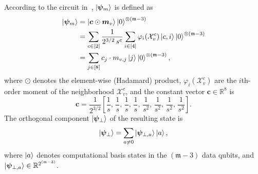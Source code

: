 \documentclass[
  reprint,
  superscriptaddress,
  amsmath,amssymb,
  aps,prl,
]{revtex4-2}
\begin{document}
According to the circuit in~, \(\ket{\boldsymbol{\psi}_m}\) is defined as
\begin{align}
\ket{\boldsymbol{\psi}_m} 
&= \ket{\boldsymbol{c} \odot \boldsymbol{m}_v} \ket{0}^{\otimes (\mathfrak{m} - 3)} \label{eq:psi_m}\\ 
&= \sum_{c \in [2]} \frac{1}{2^{3/2} \, s^c} \sum_{i \in [4]} \varphi_i(\mathcal{X}_v^c) \ket{c, i} \ket{0}^{\otimes (\mathfrak{m} - 3)} \label{eq:psi_m_detail}
\\
&= \sum_{j\in [8]} c_j \cdot m_{v,j} \ket{j} \ket{0}^{\otimes (\mathfrak{m} - 3)},
\end{align}
where \(\odot\) denotes the element-wise (Hadamard) product, \(\varphi_i(\mathcal{X}_v^c)\) are the \(i\)th-order moment of the neighborhood \(\mathcal{X}_v^c\), and the constant vector \(\boldsymbol{c} \in \mathbb{R}^8\) is
\begin{equation}
\boldsymbol{c} = \frac{1}{2^{3/2}} \left[\frac{1}{s}, \, \frac{1}{s}, \, \frac{1}{s}, \, \frac{1}{s}, \, \frac{1}{s^2}, \, \frac{1}{s^2}, \, \frac{1}{s^2}, \, \frac{1}{s^2} \right].
\label{eq:c-constant-vector}
\end{equation}
%
\noindent The orthogonal component \(\ket{\boldsymbol{\psi}_\perp}\) of the resulting state is
\begin{equation}
\ket{\boldsymbol{\psi}_\perp} = \sum_{a \neq 0} \ket{\boldsymbol{\psi}_{\perp,a}} \ket{a},
\end{equation}
where \(\ket{a}\) denotes computational basis states in the \((\mathfrak m-3)\) data qubits, and \(\ket{\boldsymbol{\psi}_{\perp,a}} \in \mathbb{R}^{2^{(\mathfrak{m}-3)}}\).
\end{document}
